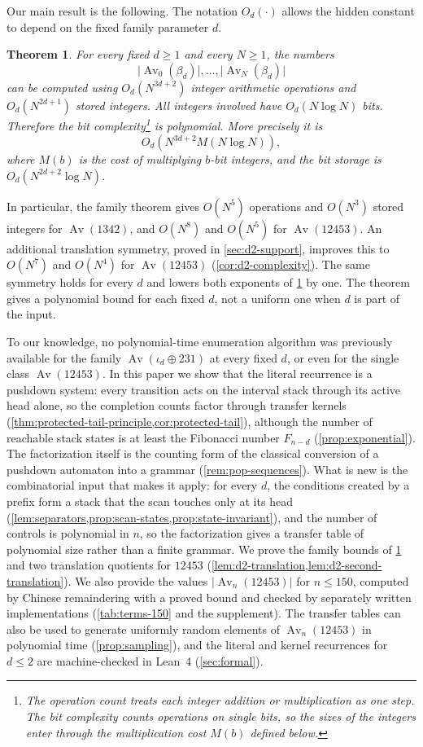 \documentclass[11pt,reqno]{amsart}
\newtheorem{theorem}{Theorem}[section]
\theoremstyle{definition}
\theoremstyle{remark}
\newcommand{\Av}{\operatorname{Av}}
\begin{document}
Our main result is the following.
The notation $O_d(\cdot)$ allows the hidden constant to depend on the fixed
family parameter $d$.

\begin{theorem}\label{thm:main}
For every fixed $d\geq1$ and every $N\geq1$, the numbers
\[
  \lvert\Av_0(\beta_d)\rvert,\ldots,\lvert\Av_N(\beta_d)\rvert
\]
can be computed using $O_d(N^{3d+2})$ integer arithmetic operations
and $O_d(N^{2d+1})$ stored integers.  All integers involved have
$O_d(N\log N)$ bits.
Therefore the bit complexity\footnote{The operation count treats each
integer addition or multiplication as one step.  The bit complexity counts
operations on single bits, so the sizes of the integers enter through the multiplication cost $M(b)$
defined below.}
is polynomial.  More precisely it is
\[
  O_d\!\left(N^{3d+2} M(N\log N)\right),
\]
where $M(b)$ is the cost of multiplying $b$-bit integers, and the bit
storage is $O_d(N^{2d+2}\log N)$.
\end{theorem}

In particular, the family theorem gives $O(N^5)$ operations and $O(N^3)$
stored integers for $\Av(1342)$, and $O(N^{8})$ and $O(N^5)$ for
$\Av(12453)$.  An additional translation symmetry, proved in
\cref{sec:d2-support}, improves this to $O(N^7)$ and $O(N^4)$ for
$\Av(12453)$ (\cref{cor:d2-complexity}).  The same symmetry holds for
every $d$ and lowers both exponents of \cref{thm:main} by one.  The
theorem gives a polynomial bound for each fixed $d$, not a uniform one when
$d$ is part of the input.

To our knowledge, no polynomial-time enumeration algorithm was
previously available for the family $\Av(\iota_d\oplus231)$ at every fixed
$d$, or even for the single class $\Av(12453)$.  In this paper we show that
the literal recurrence is a pushdown system: every transition acts on the
interval stack through its active head alone, so the completion counts
factor through transfer kernels
(\cref{thm:protected-tail-principle,cor:protected-tail}), although the
number of reachable stack states is at least the Fibonacci number
$F_{n-d}$ (\cref{prop:exponential}).  The factorization itself is the
counting form of the classical conversion of a pushdown automaton into a
grammar (\cref{rem:pop-sequences}).  What is new is the combinatorial input
that makes it apply: for every $d$, the conditions created by a prefix form a
stack that the scan touches only at its head
(\cref{lem:separators,prop:scan-states,prop:state-invariant}), and the number
of controls is polynomial in $n$, so the factorization gives a transfer table
of polynomial size rather than a finite grammar.  We prove the family bounds of
\cref{thm:main} and two translation quotients for $12453$
(\cref{lem:d2-translation,lem:d2-second-translation}).  We also provide
the values $\lvert\Av_n(12453)\rvert$ for $n\leq150$, computed by Chinese remaindering
with a proved bound and checked by separately written implementations
(\cref{tab:terms-150} and the supplement).  The
transfer tables can also be used to generate uniformly random elements of
$\Av_n(12453)$ in polynomial time (\cref{prop:sampling}), and the literal and
kernel recurrences for $d\leq2$ are machine-checked in Lean~4
(\cref{sec:formal}).
\end{document}
